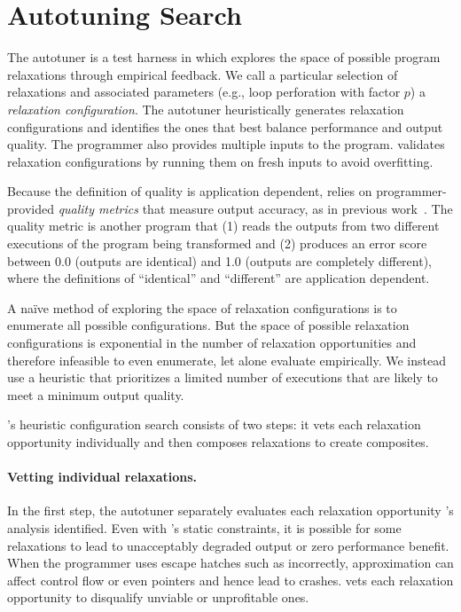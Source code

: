\section{Autotuning Search}
\label{accept:sec:autotuner}

The autotuner is a test harness in which \sysname explores the space of possible
program relaxations through empirical feedback.  We call
a particular selection of relaxations and associated parameters (e.g., loop
perforation with factor $p$) a \emph{relaxation configuration}.  The
autotuner heuristically generates relaxation configurations and identifies the
ones that best balance performance and output quality.
%
The programmer also provides multiple inputs to the program.  \sysname validates
relaxation configurations by running them on fresh inputs to avoid overfitting.

Because the definition of quality is application dependent, \sysname relies on
programmer-provided \emph{quality metrics} that measure output
accuracy, as in previous work~\cite{enerj, truffle, qosprof, carbin-pldi, green,
npu}.
The quality metric is another program that (1) reads the outputs
from two different executions of the program being transformed and (2) produces
an error score between 0.0 (outputs are identical) and 1.0 (outputs are
completely different), where the definitions of ``identical'' and ``different''
are application dependent.

A na\"ive method of exploring the space of relaxation configurations is to
enumerate all possible configurations.
But the space of possible relaxation configurations is exponential in the number
of relaxation opportunities and therefore infeasible to even enumerate, let
alone evaluate empirically.
We instead use a heuristic that prioritizes a limited number of
executions that are likely to meet a minimum output quality.

\sysname's heuristic configuration search consists of two steps: it vets each
relaxation opportunity individually and then composes relaxations to create
composites.

\paragraph{Vetting individual relaxations.}
In the first step, the autotuner separately evaluates each
relaxation opportunity \sysname's analysis identified. Even with \sysname's
static constraints, it is
possible for some relaxations to lead to unacceptably degraded output or
zero performance benefit.
When the programmer uses escape hatches such as 
incorrectly, approximation can affect control flow or even pointers and
hence lead to crashes.
\sysname vets each
relaxation opportunity to disqualify unviable or unprofitable ones.

